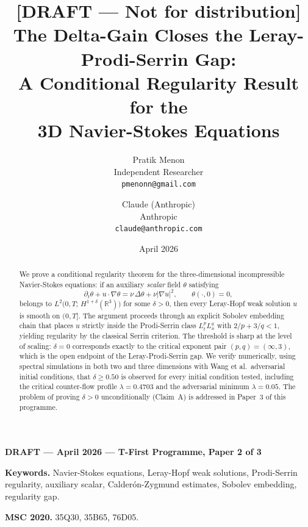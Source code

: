 \documentclass[12pt]{article}
\title{%
  {\draftcolor\textbf{[DRAFT --- Not for distribution]}}\\[6pt]
  \textbf{The Delta-Gain Closes the Leray-Prodi-Serrin Gap:\\
          A Conditional Regularity Result for the\\
          3D Navier-Stokes Equations}
}
\author{
  Pratik Menon\\[2pt]
  \small Independent Researcher\\[2pt]
  \small \texttt{pmenonn@gmail.com}
  \and
  Claude (Anthropic)\\[2pt]
  \small Anthropic\\[2pt]
  \small \texttt{claude@anthropic.com}
}
\date{April 2026}
\theoremstyle{plain}
\theoremstyle{definition}
\theoremstyle{remark}
\newcommand{\R}{\mathbb{R}}
\newcommand{\abs}[1]{\left|#1\right|}
\newcommand{\pa}{\partial}
\newcommand{\grad}{\nabla}
\newcommand{\lap}{\Delta}
\newcommand{\draftcolor}{\color{red!70!black}}
\begin{document}

\maketitle
\thispagestyle{empty}

\begin{center}
  {\draftcolor\textbf{DRAFT — April 2026 — T-First Programme, Paper 2 of 3}}
\end{center}

\vspace{4pt}

\begin{abstract}
We prove a conditional regularity theorem for the three-dimensional incompressible
Navier-Stokes equations: if an auxiliary \emph{scalar} field $\theta$ satisfying
\[
  \pa_t\theta + u\cdot\grad\theta = \nu\,\lap\theta + \nu\abs{\grad u}^2,
  \qquad \theta(\cdot,0)=0,
\]
belongs to $L^2\bigl(0,T;\,H^{1+\delta}(\R^3)\bigr)$ for some $\delta>0$, then every
Leray-Hopf weak solution $u$ is smooth on $(0,T]$.
The argument proceeds through an explicit Sobolev embedding chain that places $u$
strictly inside the Prodi-Serrin class $L^p_t L^q_x$ with
$2/p+3/q<1$, yielding regularity by the classical Serrin criterion.
The threshold is sharp at the level of scaling: $\delta=0$ corresponds exactly
to the critical exponent pair $(p,q)=(\infty,3)$, which is the open endpoint of
the Leray-Prodi-Serrin gap.
We verify numerically, using spectral simulations in both two and three dimensions
with Wang et al.\ adversarial initial conditions, that $\delta\geq 0.50$
is observed for every initial condition tested, including the critical counter-flow
profile $\lambda=0.4703$ and the adversarial minimum $\lambda=0.05$.
The problem of proving $\delta>0$ unconditionally (Claim~A) is addressed in
Paper~3 of this programme.
\end{abstract}

\vspace{8pt}
\noindent\textbf{Keywords.}
Navier-Stokes equations, Leray-Hopf weak solutions, Prodi-Serrin regularity,
auxiliary scalar, Calderón-Zygmund estimates, Sobolev embedding, regularity gap.

\vspace{8pt}
\noindent\textbf{MSC 2020.}
35Q30, 35B65, 76D05.

\tableofcontents

\newpage

\end{document}
